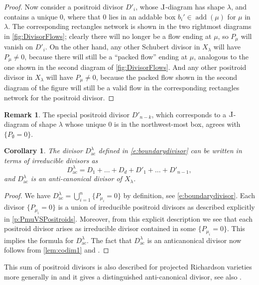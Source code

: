 \documentclass{amsart}
\def\Le{\hbox{\rotatebox[origin=c]{180}{$\Gamma$}}}
\newtheorem{cor}[thm]{Corollary}
\theoremstyle{definition}
\newtheorem{remark}[thm]{Remark}
\numberwithin{equation}{section}
\newcommand{\add}{\operatorname{add}}
\newcommand{\Dac}{D_{\operatorname{ac}}}
\newcommand{\ac}{\operatorname{ac}}
\begin{document}
\begin{proof}
Now consider a positroid divisor $D'_i$, whose $\Le$-diagram has shape $\lambda$,
and contains a unique $0$, where that 
 $0$ lies in 
 an addable box $b_i'\in \add(\mu)$ for $\mu$ in $\lambda$.
The corresponding rectangles network is shown in the 
two rightmost diagrams in \cref{fig:DivisorFlows}; clearly 
there will no longer be a flow ending at $\mu$, so 
$P_{\mu}$ will vanish on $D'_i$. On the other hand,
any other Schubert divisor in $X_{\lambda}$
will have $P_{\mu} \neq 0$, because there will still be
a  ``packed flow'' ending at $\mu$, analogous to the one shown
in the second diagram of \cref{fig:DivisorFlows}.
And any other positroid divisor in $X_{\lambda}$
will have $P_{\mu} \neq 0$, because the packed
flow shown in the second diagram of the figure
will still be a valid flow in the corresponding 
rectangles network for the positroid divisor.
\end{proof}


\begin{remark}\label{r:specialdivisor}
The special positroid divisor $D'_{n-k}$, which corresponds
to a $\Le$-diagram of shape $\lambda$ whose unique $0$ 
is in the northwest-most box, agrees with
	$\{P_{\emptyset}=0\}$. 
\end{remark}

\begin{cor}\label{c:ac} The divisor $D^\lambda_{\ac}$ defined in \eqref{e:boundarydivisor} can be written in terms of irreducible divisors as
\[
\Dac^\lambda = D_1 + \dots + D_d+D'_1+\dotsc+ D'_{n-1},
\]
and $\Dac^\lambda$ is an anti-canonical divisor of $X_\lambda$.
\end{cor}

\begin{proof}  We have $\Dac^\lambda=\bigcup_{i=1}^n\{P_{\mu_i}=0\}$ by definition, see \eqref{e:boundarydivisor}. Each divisor $\{P_{\mu_i}=0\}$ is a union of irreducible positroid divisors as described explicitly in \cref{p:PmuVSPositroids}. Moreover, from this explicit description we see that each positroid divisor arises as irreducible divisor contained in some $\{P_{\mu_i}=0\}$. This implies the formula for $\Dac^\lambda$. The fact that $\Dac^\lambda$ is an anticanonical divisor now follows from \cref{lem:codim1}
and \cite[Lemma 5.4]{KLS:ProjRich}. 
\end{proof}


This sum of positroid divisors is also described for projected Richardson varieties more generally in \cite[Lemma~5.4]{KLS:ProjRich} and it gives a distinguished anti-canonical divisor, see also \cite{Brion:GeomFlag}.
\end{document}
